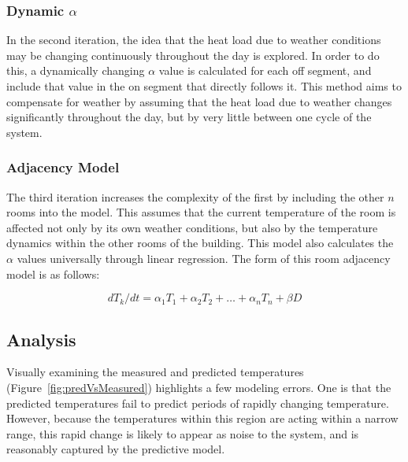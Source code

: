 \subsubsection{Dynamic $\alpha$}
\label{sec:dynamicalpha}

In the second iteration, the idea that the heat load due to weather conditions
may be changing continuously throughout the day is explored. In order to do
this, a dynamically changing $\alpha$ value is calculated for each off segment,
and include that value in the on segment that directly follows it. This method
aims to compensate for weather by assuming that the heat load due to weather
changes significantly throughout the day, but by very little between one cycle
of the system.

\subsubsection{Adjacency Model}
\label{sec:adjmodel}

The third iteration increases the complexity of the first by including the other
$n$ rooms into the model. This assumes that the current temperature of the room
is affected not only by its own weather conditions, but also by the temperature
dynamics within the other rooms of the building. This model also calculates the
$\alpha$ values universally through linear regression. The form of this room
adjacency model is as follows:

\begin{equation}\label{adjeq}dT_k/dt=\alpha_1T_1+\alpha_2T_2+
  \dots+\alpha_nT_n+\beta D \end{equation}

\subsection{Analysis}
\label{sec:analysis}


Visually examining the measured and predicted temperatures
(Figure~\ref{fig:predVsMeasured}) highlights a few modeling errors. One is that
the predicted temperatures fail to predict periods of rapidly changing
temperature. However, because the temperatures within this region are acting
within a narrow range, this rapid change is likely to appear as noise to the
system, and is reasonably captured by the predictive model.

